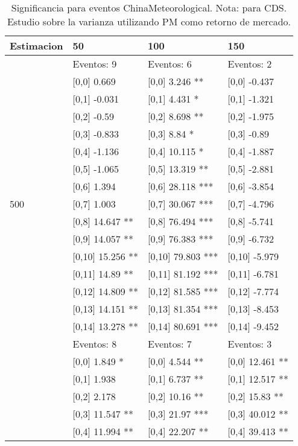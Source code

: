 \begin{table}

\caption{Significancia para eventos ChinaMeteorological. Nota: para CDS. Estudio sobre la varianza utilizando PM como retorno de mercado.}
\centering
\begin{tabular}[t]{llll}
\toprule
Estimacion & 50 & 100 & 150\\
\midrule
 & Eventos:  9 & Eventos:  6 & Eventos:  2\\
 & {}[0,0] 0.669 & {}[0,0] 3.246 ** & {}[0,0] -0.437\\
 & {}[0,1] -0.031 & {}[0,1] 4.431 * & {}[0,1] -1.321\\
 & {}[0,2] -0.59 & {}[0,2] 8.698 ** & {}[0,2] -1.975\\
 & {}[0,3] -0.833 & {}[0,3] 8.84 * & {}[0,3] -0.89\\
\addlinespace
 & {}[0,4] -1.136 & {}[0,4] 10.115 * & {}[0,4] -1.887\\
 & {}[0,5] -1.065 & {}[0,5] 13.319 ** & {}[0,5] -2.881\\
 & {}[0,6] 1.394 & {}[0,6] 28.118 *** & {}[0,6] -3.854\\
500 & {}[0,7] 1.003 & {}[0,7] 30.067 *** & {}[0,7] -4.796\\
 & {}[0,8] 14.647 ** & {}[0,8] 76.494 *** & {}[0,8] -5.741\\
\addlinespace
 & {}[0,9] 14.057 ** & {}[0,9] 76.383 *** & {}[0,9] -6.732\\
 & {}[0,10] 15.256 ** & {}[0,10] 79.803 *** & {}[0,10] -5.979\\
 & {}[0,11] 14.89 ** & {}[0,11] 81.192 *** & {}[0,11] -6.781\\
 & {}[0,12] 14.809 ** & {}[0,12] 81.585 *** & {}[0,12] -7.774\\
 & {}[0,13] 14.151 ** & {}[0,13] 81.354 *** & {}[0,13] -8.453\\
\addlinespace
 & {}[0,14] 13.278 ** & {}[0,14] 80.691 *** & {}[0,14] -9.452\\
 & Eventos:  8 & Eventos:  7 & Eventos:  3\\
 & {}[0,0] 1.849 * & {}[0,0] 4.544 ** & {}[0,0] 12.461 **\\
 & {}[0,1] 1.938 & {}[0,1] 6.737 ** & {}[0,1] 12.517 **\\
 & {}[0,2] 2.178 & {}[0,2] 10.16 ** & {}[0,2] 15.83 **\\
\addlinespace
 & {}[0,3] 11.547 ** & {}[0,3] 21.97 *** & {}[0,3] 40.012 **\\
 & {}[0,4] 11.994 ** & {}[0,4] 22.207 ** & {}[0,4] 39.413 **\\

\end{tabular}
\end{table}
